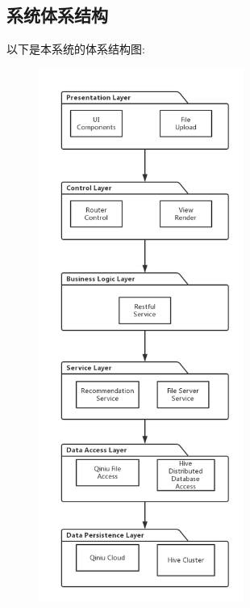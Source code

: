 \documentclass[UTF8]{ctexart}
\begin{document}
\subsection{系统体系结构}
以下是本系统的体系结构图:\\
\begin{figure}[H]
\centering
\includegraphics[width = 0.6\textwidth]{archetecture_design.png}
\end{figure}
\end{document}
